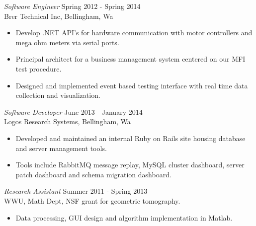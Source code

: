 \documentclass[line,margin]{res}
\begin{document}
\begin{resume}
		{\sl Software Engineer} \hfill Spring 2012 - Spring 2014 \\
                	Brer Technical Inc, Bellingham, Wa
                	\begin{itemize}  \itemsep -2pt
                		\item Develop .NET API's for hardware communication with motor controllers and mega ohm meters via serial ports.
                		\item Principal architect for a business management system centered on our MFI test procedure.
			\item Designed and implemented event based testing interface with real time data collection and visualization.  
               	 \end{itemize}
 
		{\sl Software Developer} \hfill June 2013 - January 2014 \\
                	Logos Research Systems, Bellingham, Wa
               	 \begin{itemize}  \itemsep -2pt
                		\item Developed and maintained an internal Ruby on Rails site housing database and server management tools. 
	     		\item Tools include RabbitMQ message replay, MySQL cluster dashboard, server patch dashboard and schema migration dashboard.
                	\end{itemize}

                	{\sl Research Assistant} \hfill            Summer 2011 - Spring 2013 \\
                	WWU, Math Dept, NSF grant for geometric tomography.
                 	\begin{itemize}  \itemsep -2pt
                 		\item Data processing, GUI design and algorithm implementation in Matlab.
                 	\end{itemize} 


	

\end{resume}
\end{document}
